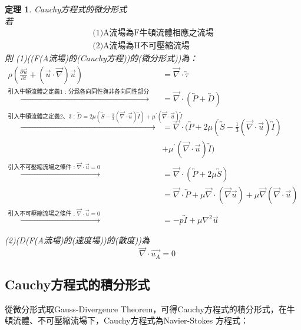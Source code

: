 \documentclass[12pt]{article}
\theoremstyle{upright}
\newtheorem{theorem}{定理}[section]
\begin{document}
\begin{theorem}Cauchy方程式的微分形式
\mbox{}\\[0.3ex]%
若
\[
\begin{array}{l}
    \text{(1)A流場為F牛頓流體相應之流場}\\
    \text{(2)A流場為H不可壓縮流場}
\end{array}
\]
\noindent 則
(1)\quad ((F(A流場)的(Cauchy方程))的(微分形式))為：
\begin{equation}\begin{aligned}
    \rho\left(\frac{\partial \vec{u}}{\partial t} + (\vec{u}\cdot \vec{\nabla})\vec{u}\right)  &=\vec{\nabla }\cdot \overleftrightarrow{\tau}\\[1.2ex]
   \xrightarrow{\text{引入牛頓流體之定義1 : 分爲各向同性與非各向同性部分}} &= \vec{\nabla}\cdot(\overleftrightarrow{P} + \overleftrightarrow{D})\\[1.2ex]
   \xrightarrow{\text{引入牛頓流體之定義2、3 : $\overleftrightarrow{D} = 2\mu(\overleftrightarrow{S}-\frac{1}{3}(\vec{\nabla}\cdot \vec{u})\overleftrightarrow{I})+\mu^{\prime}(\vec{\nabla}\cdot \vec{u})\overleftrightarrow{I}$}} &= \vec{\nabla}\cdot(\overleftrightarrow{P} + 2\mu(\overleftrightarrow{S}-\frac{1}{3}(\vec{\nabla}\cdot \vec{u})\overleftrightarrow{I})\\[2.5ex] 
   &+\mu^{\prime}(\vec{\nabla}\cdot \vec{u})\overleftrightarrow{I})\\[1.2ex]
   \xrightarrow{\text{引入不可壓縮流場之條件 : $\vec{\nabla }\cdot \vec{u} = 0$}} &= \vec{\nabla}\cdot(\overleftrightarrow{P} + 2\mu\overleftrightarrow{S})\\[2.5ex]
   &= \vec{\nabla }\cdot \overleftrightarrow{P} + \mu \vec{\nabla}\cdot \left(\vec{\nabla}\vec{u}\right) + \mu\vec{\nabla }\left(\vec{\nabla}\cdot \vec{u}\right) \\[1.2ex]
   \xrightarrow{\text{引入不可壓縮流場之條件 : $\vec{\nabla }\cdot \vec{u} = 0$}} &= -p\overleftrightarrow{I} + \mu\nabla^2{\vec{u}}
\end{aligned}\end{equation} 

(2)\quad (D(F(A流場)的(速度場))的(散度))為
\begin{equation}\quad \vec{\nabla }\cdot \vec{u_A} = 0 \end{equation} 
\end{theorem}

\subsection{Cauchy方程式的積分形式}
\vspace{0.4ex}
從微分形式取Gauss-Divergence Theorem，可得Cauchy方程式的積分形式，在牛頓流體、不可壓縮流場下，Cauchy方程式為Navier-Stokes 方程式：
\end{document}
